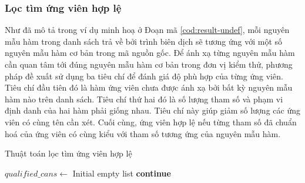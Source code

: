 \subsubsection*{Lọc tìm ứng viên hợp lệ}
Như đã mô tả trong ví dụ minh hoạ ở Đoạn mã \autoref{cod:result-undef}, mỗi nguyên mẫu hàm trong danh sách trả về bởi trình biên dịch sẽ tương ứng với một số nguyên mẫu hàm cơ bản trong mã nguồn gốc. Để ánh xạ từng nguyên mẫu hàm cần quan tâm tới đúng nguyên mẫu hàm cơ bản trong đơn vị kiểm thử, phương pháp đề xuất sử dụng ba tiêu chí để đánh giá độ phù hợp của từng ứng viên. Tiêu chí đầu tiên đó là hàm ứng viên chưa được ánh xạ bởi bất kỳ nguyên mẫu hàm nào trên danh sách. Tiêu chí thứ hai đó là số lượng tham số và phạm vi định danh của hai hàm phải giống nhau. Tiêu chí này giúp giảm số lượng các ứng viên có cùng tên cần xét. Cuối cùng, ứng viên hợp lệ nếu từng tham số đã chuẩn hoá của ứng viên có cùng kiểu với tham số tương ứng của nguyên mẫu hàm.
\begin{algorithm}
    \small
    \caption{Thuật toán lọc tìm ứng viên hợp lệ}
    \label{alg:filter-undef}
					
    $qualified\_cans \leftarrow$ Initial empty list\;
     {
         {
            \textbf{continue}
        }
    }
\end{algorithm}

